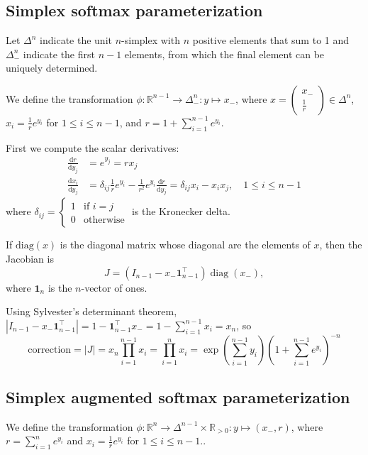 \documentclass[11pt]{article}
\begin{document}
\subsection{Simplex softmax parameterization}

Let $\Delta^n$ indicate the unit $n$-simplex with $n$ positive
elements that sum to 1 and $\Delta^n_-$ indicate the first $n-1$
elements, from which the final element can be uniquely determined.

We define the transformation
$\phi: \mathbb{R}^{n-1} \to \Delta^n_-: y \mapsto x_-$, where
$x=\begin{pmatrix}x_- \\ \frac{1}{r}\end{pmatrix} \in \Delta^n$,
$x_i = \frac{1}{r} e^{y_i}$ for $1 \le i \le n-1$, and
$r = 1 + \sum_{i=1}^{n-1} e^{y_i}$.

First we compute the scalar derivatives:
\[
\begin{aligned}
  \frac{\mathrm{d} r}{\mathrm{d} y_j}
  &= e^{y_j} = r x_j\\
  \frac{\mathrm{d} x_i}{\mathrm{d} y_j}
  &= \delta_{ij} \frac{1}{r} e^{y_i} - \frac{1}{r^2} e^{y_i}
  \frac{\mathrm{d} r}{\mathrm{d} y_j}
  = \delta_{ij} x_i - x_i x_j, \quad 1 \le i \le n-1
\end{aligned}
\]
where
$\delta_{ij} = \begin{cases} 1 &\text{if } i = j \\ 0
  &\text{otherwise}\end{cases}$ is the Kronecker delta.

If $\mathrm{diag}(x)$ is the diagonal matrix whose diagonal are the
elements of $x$, then the Jacobian is
\[
  J = (I_{n-1} - x_- \boldsymbol{1}_{n-1}^\top) \operatorname{diag}(x_-),
\]
where $\boldsymbol{1}_n$ is the $n$-vector of ones.

Using Sylvester's determinant theorem,
$|I_{n-1} - x_- \boldsymbol{1}_{n-1}^\top| = 1 -
\boldsymbol{1}_{n-1}^\top x_- = 1 - \sum_{i=1}^{n-1} x_i = x_n$, so
$$\mathrm{correction} = |J| = x_n \prod_{i=1}^{n-1} x_i = \prod_{i=1}^{n} x_i = \exp\left(\sum_{i=1}^{n-1} y_i\right) \left(1 + \sum_{i=1}^{n-1} e^{y_i}\right)^{-n}$$


\subsection{Simplex augmented softmax parameterization}

We define the transformation
$\phi: \mathbb{R}^n \to \Delta^{n-1} \times \mathbb{R}_{>0}: y \mapsto
(x_-, r)$, where $r = \sum_{i=1}^n e^{y_i}$ and
$x_i = \frac{1}{r} e^{y_i}$ for $1 \le i \le n-1$..
\end{document}
